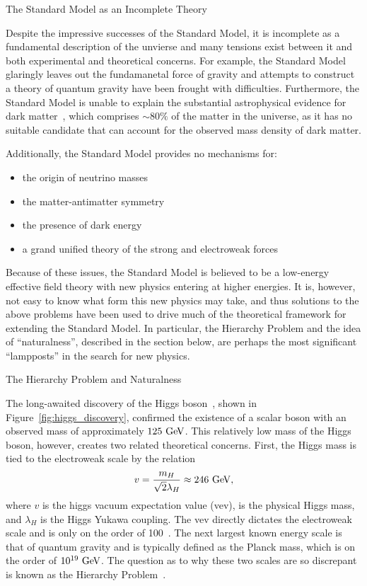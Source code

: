 \begin{section}{The Standard Model as an Incomplete Theory}

Despite the impressive successes of the Standard Model, it is incomplete as a fundamental description of the unvierse and many tensions exist between it and both experimental and theoretical concerns.
For example, the Standard Model glaringly leaves out the fundamanetal force of gravity and attempts to construct a theory of quantum gravity have been frought with difficulties.
Furthermore, the Standard Model is unable to explain the substantial astrophysical evidence for dark matter~\cite{Bertone:2004pz,Rubin:1970zza}, which comprises $\sim 80\%$ of the matter in the universe, as it has no suitable candidate that can account for the observed mass density of dark matter.

Additionally, the Standard Model provides no mechanisms for:
\begin{itemize}
\item the origin of neutrino masses
\item the matter-antimatter symmetry
\item the presence of dark energy
\item a grand unified theory of the strong and electroweak forces
\end{itemize}

Because of these issues, the Standard Model is believed to be a low-energy effective field theory with new physics entering at higher energies.
It is, however, not easy to know what form this new physics may take, and thus solutions to the above problems have been used to drive much of the theoretical framework for extending the Standard Model.
In particular, the Hierarchy Problem and the idea of ``naturalness'', described in the section below, are perhaps the most significant ``lampposts'' in the search for new physics.

\begin{subsection}{The Hierarchy Problem and Naturalness}

The long-awaited discovery of the Higgs boson~\cite{Aad:2012tfa,Chatrchyan:2012xdj,Chatrchyan:2013lba,Khachatryan:2014jba,Aad:2014aba,Aad:2015zhl}, shown in Figure~\ref{fig:higgs_discovery}, confirmed the existence of a scalar boson with an observed mass of approximately $125~\mathrm{Ge\kern -0.1em V}$.
This relatively low mass of the Higgs boson, however, creates two related theoretical concerns.
First, the Higgs mass is tied to the electroweak scale by the relation 
\begin{align}
v = \frac{m_{H}}{\sqrt{2}\lambda_H} \approx 246~\mathrm{Ge\kern -0.1em V},
\end{align}
where $v$ is the higgs vacuum expectation value (vev), \mh is the physical Higgs mass, and $\lambda_H$ is the Higgs Yukawa coupling.
The vev directly dictates the electroweak scale and is only on the order of 100~\GeV.
The next largest known energy scale is that of quantum gravity and is typically defined as the Planck mass, which is on the order of $10^{19}~\mathrm{Ge\kern -0.1em V}$.
The question as to why these two scales are so discrepant is known as the Hierarchy Problem~\cite{Barbieri:1987fn}.


\end{subsection}
\end{section}
